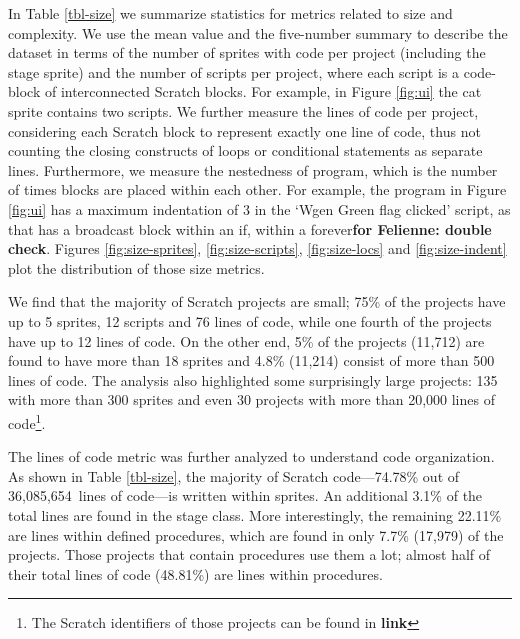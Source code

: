 \documentclass{sig-alternate}
\newcommand{\nLOC}{36,085,654}
\newcommand{\todo}[1]{\textbf{#1}}
\begin{document}
In Table \ref{tbl-size} we summarize statistics for metrics related to size and complexity. We use the mean value and the five-number summary to describe the dataset in terms of the number of sprites with code per project (including the stage sprite) and the number of scripts per project, where each script is a code-block of interconnected Scratch blocks. For example, in Figure \ref{fig:ui} the cat sprite contains two scripts. We further measure the lines of code per project, considering each Scratch block to represent exactly one line of code, thus not counting the closing constructs of loops or conditional statements as separate lines. Furthermore, we measure the nestedness of program, which is the number of times blocks are placed within each other. For example, the program in Figure \ref{fig:ui} has a maximum indentation of 3 in the `Wgen Green flag clicked' script, as that has a broadcast block within an if, within a forever\todo{for Felienne: double check}. Figures \ref{fig:size-sprites}, \ref{fig:size-scripts}, \ref{fig:size-locs} and \ref{fig:size-indent} plot the distribution of those size metrics.

We find that the majority of Scratch projects are small; 75\% of the projects have up to 5 sprites, 12 scripts and 76 lines of code, while one fourth of the projects have up to 12 lines of code. On the other end, 5\% of the projects (11,712) are found to have more than 18 sprites and 4.8\% (11,214) consist of more than 500 lines of code. The analysis also highlighted some surprisingly large projects: 135 with more than 300 sprites and even 30 projects with more than 20,000 lines of code\footnote{The Scratch identifiers of those projects can be found in \todo{link}}.

The lines of code metric was further analyzed to understand code organization. As shown in Table \ref{tbl-size}, the majority of Scratch code---74.78\% out of \nLOC~lines of code---is written within sprites. An additional 3.1\% of the total lines are found in the stage class. More interestingly, the remaining 22.11\% are lines within defined procedures, which are found in only 7.7\% (17,979) of the projects. Those projects that contain procedures use them a lot; almost half of their total lines of code (48.81\%) are lines within procedures.
\end{document}
